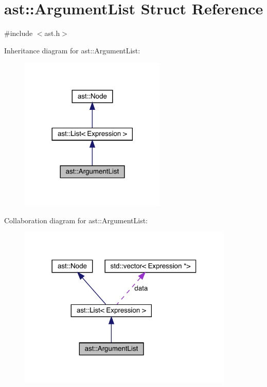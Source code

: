 \hypertarget{structast_1_1_argument_list}{}\section{ast\+:\+:Argument\+List Struct Reference}
\label{structast_1_1_argument_list}


{\ttfamily \#include $<$ast.\+h$>$}



Inheritance diagram for ast\+:\+:Argument\+List\+:\nopagebreak
\begin{figure}[H]
\begin{center}
\leavevmode
\includegraphics[width=197pt]{structast_1_1_argument_list__inherit__graph}
\end{center}
\end{figure}


Collaboration diagram for ast\+:\+:Argument\+List\+:\nopagebreak
\begin{figure}[H]
\begin{center}
\leavevmode
\includegraphics[width=290pt]{structast_1_1_argument_list__coll__graph}
\end{center}
\end{figure}
